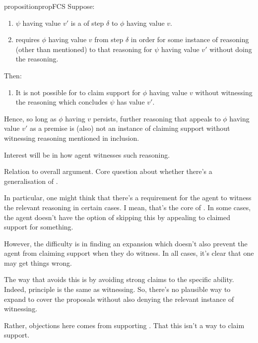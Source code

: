 \begin{note}
  \begin{restatable}{proposition}{propFCS}
    \label{prop:fcs}
    Suppose:

    \begin{enumerate}
    \item
      \(\psi\) having value \(v'\) is a \crequ{} of step \(\delta\) to \(\phi\) having value \(v\).
    \item
      \vAgent{} requires \(\phi\) having value \(v\) from step \(\delta\)
      in order for some instance of reasoning (other than mentioned) to \indicateN{} that reasoning for \(\psi\) having value \(v'\) without doing the reasoning.
    \end{enumerate}

    Then:
    \begin{enumerate}[resume]
    \item
      It is not possible for \vAgent{} to claim support for \(\phi\) having value \(v\) without witnessing the reasoning which concludes \(\psi\) has value \(v'\).
    \end{enumerate}
    \vspace{-\baselineskip}
  \end{restatable}

  Hence, so long as \(\phi\) having \(v\) persists, further reasoning that appeals to \(\phi\) having value \(v'\) as a premise is (also) not an instance of claiming support without witnessing reasoning mentioned in {\color{red} inclusion}.

  {
    \color{red}
    Interest will be in how agent witnesses such reasoning.
  }
\end{note}

\begin{note}
  {
    \color{red} Relation to overall argument.
  }
  Core question about whether there's a generalisation of \ideaCS{}.

  In particular, one might think that there's a requirement for the agent to witness the relevant reasoning in certain cases.
  I mean, that's the core of \ideaCS{}.
  In some cases, the agent doesn't have the option of skipping this by appealing to claimed support for something.

  However, the difficulty is in finding an expansion which doesn't also prevent the agent from claiming support when they do witness.
  In all cases, it's clear that one may get things wrong.

  The way that \adB{} avoids this is by avoiding strong claims to the specific ability.
  Indeed, principle is the same as witnessing.
  So, there's no plausible way to expand \ideaCS{} to cover the proposals without also denying the relevant instance of witnessing.

  Rather, objections here comes from supporting \ESU{}.
  That this isn't a way to claim support.
\end{note}


